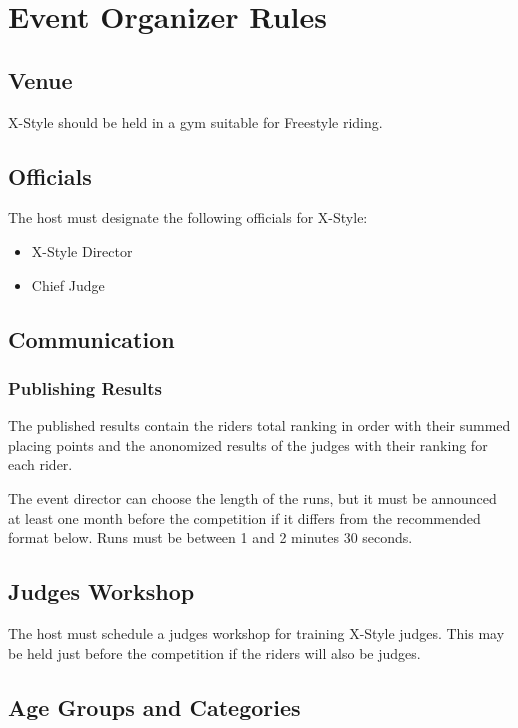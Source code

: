 \chapter{Event Organizer Rules}

\section{Venue}

X-Style should be held in a gym suitable for Freestyle riding.%

\section{Officials}

The host must designate the following officials for X-Style:
\begin{itemize}
\item X-Style Director
\item Chief Judge
\end{itemize}

\section{Communication}

\subsection{Publishing Results}
The published results contain the riders total ranking in order with their summed placing points and the anonomized results of the judges with their ranking for each rider.

The event director can choose the length of the runs, but it must be announced at least one month before the competition if it differs from the recommended format below.
Runs must be between 1 and 2 minutes 30 seconds.

\section{Judges Workshop}

The host must schedule a judges workshop for training X-Style judges.
This may be held just before the competition if the riders will also be judges.

\section{Age Groups and Categories}

